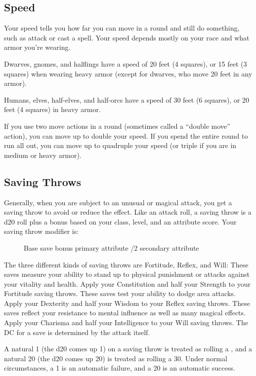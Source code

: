 \subsection{Speed}
Your speed tells you how far you can move in a round and still do something, such as attack or cast a spell. Your speed depends mostly on your race and what armor you're wearing.

Dwarves, gnomes, and halflings have a speed of 20 feet (4 squares), or 15 feet (3 squares) when wearing heavy armor (except for dwarves, who move 20 feet in any armor).

Humans, elves, half-elves, and half-orcs have a speed of 30 feet (6 squares), or 20 feet (4 squares) in heavy armor.

If you use two move actions in a round (sometimes called a ``double move'' action), you can move up to double your speed. If you spend the entire round to run all out, you can move up to quadruple your speed (or triple if you are in medium or heavy armor).

\subsection{Saving Throws}
Generally, when you are subject to an unusual or magical attack, you get a saving throw to avoid or reduce the effect. Like an attack roll, a saving throw is a d20 roll plus a bonus based on your class, level, and an attribute score. Your saving throw modifier is:
\begin{figure}[h]
\centering Base save bonus \add primary attribute /2 secondary attribute
\end{figure}

 The three different kinds of saving throws are Fortitude, Reflex, and Will:
 These saves measure your ability to stand up to physical punishment or attacks against your vitality and health. Apply your Constitution and half your Strength to your Fortitude saving throws.
 These saves test your ability to dodge area attacks. Apply your Dexterity and half your Wisdom to your Reflex saving throws.
 These saves reflect your resistance to mental influence as well as many magical effects. Apply your Charisma and half your Intelligence to your Will saving throws.
 The DC for a save is determined by the attack itself.

 A natural 1 (the d20 comes up 1) on a saving throw is treated as rolling a , and a natural 20 (the d20 comes up 20) is treated as rolling a 30. Under normal circumstances, a 1 is an automatic failure, and a 20 is an automatic success.

